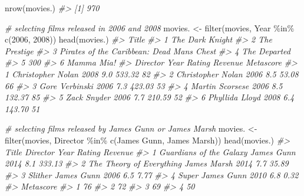\documentclass[
]{book}
\newenvironment{Shaded}{\begin{snugshade}}{\end{snugshade}}
\newcommand{\CommentTok}[1]{\textcolor[rgb]{0.56,0.35,0.01}{\textit{#1}}}
\newcommand{\DecValTok}[1]{\textcolor[rgb]{0.00,0.00,0.81}{#1}}
\newcommand{\FunctionTok}[1]{\textcolor[rgb]{0.00,0.00,0.00}{#1}}
\newcommand{\NormalTok}[1]{#1}
\newcommand{\OtherTok}[1]{\textcolor[rgb]{0.56,0.35,0.01}{#1}}
\newcommand{\SpecialCharTok}[1]{\textcolor[rgb]{0.00,0.00,0.00}{#1}}
\newcommand{\StringTok}[1]{\textcolor[rgb]{0.31,0.60,0.02}{#1}}
\begin{document}
\begin{Shaded}
\begin{Highlighting}[]
\FunctionTok{nrow}\NormalTok{(movies.)}
\CommentTok{\#\textgreater{} [1] 970}

\CommentTok{\# selecting films released in 2006 and 2008}
\NormalTok{movies. }\OtherTok{\textless{}{-}} \FunctionTok{filter}\NormalTok{(movies, Year }\SpecialCharTok{\%in\%} \FunctionTok{c}\NormalTok{(}\DecValTok{2006}\NormalTok{, }\DecValTok{2008}\NormalTok{))}
\FunctionTok{head}\NormalTok{(movies.)}
\CommentTok{\#\textgreater{}                                        Title}
\CommentTok{\#\textgreater{} 1                            The Dark Knight}
\CommentTok{\#\textgreater{} 2                               The Prestige}
\CommentTok{\#\textgreater{} 3 Pirates of the Caribbean: Dead Man\textquotesingle{}s Chest}
\CommentTok{\#\textgreater{} 4                               The Departed}
\CommentTok{\#\textgreater{} 5                                        300}
\CommentTok{\#\textgreater{} 6                                 Mamma Mia!}
\CommentTok{\#\textgreater{}            Director Year Rating Revenue Metascore}
\CommentTok{\#\textgreater{} 1 Christopher Nolan 2008    9.0  533.32        82}
\CommentTok{\#\textgreater{} 2 Christopher Nolan 2006    8.5   53.08        66}
\CommentTok{\#\textgreater{} 3    Gore Verbinski 2006    7.3  423.03        53}
\CommentTok{\#\textgreater{} 4   Martin Scorsese 2006    8.5  132.37        85}
\CommentTok{\#\textgreater{} 5       Zack Snyder 2006    7.7  210.59        52}
\CommentTok{\#\textgreater{} 6    Phyllida Lloyd 2008    6.4  143.70        51}

\CommentTok{\# selecting films released by \textquotesingle{}James Gunn\textquotesingle{} or \textquotesingle{}James Marsh\textquotesingle{}}
\NormalTok{movies. }\OtherTok{\textless{}{-}} \FunctionTok{filter}\NormalTok{(movies, Director }\SpecialCharTok{\%in\%} \FunctionTok{c}\NormalTok{(}\StringTok{\textquotesingle{}James Gunn\textquotesingle{}}\NormalTok{, }\StringTok{\textquotesingle{}James Marsh\textquotesingle{}}\NormalTok{))}
\FunctionTok{head}\NormalTok{(movies.)}
\CommentTok{\#\textgreater{}                      Title    Director Year Rating Revenue}
\CommentTok{\#\textgreater{} 1  Guardians of the Galaxy  James Gunn 2014    8.1  333.13}
\CommentTok{\#\textgreater{} 2 The Theory of Everything James Marsh 2014    7.7   35.89}
\CommentTok{\#\textgreater{} 3                  Slither  James Gunn 2006    6.5    7.77}
\CommentTok{\#\textgreater{} 4                    Super  James Gunn 2010    6.8    0.32}
\CommentTok{\#\textgreater{}   Metascore}
\CommentTok{\#\textgreater{} 1        76}
\CommentTok{\#\textgreater{} 2        72}
\CommentTok{\#\textgreater{} 3        69}
\CommentTok{\#\textgreater{} 4        50}


\end{Highlighting}
\end{Shaded}
\end{document}
